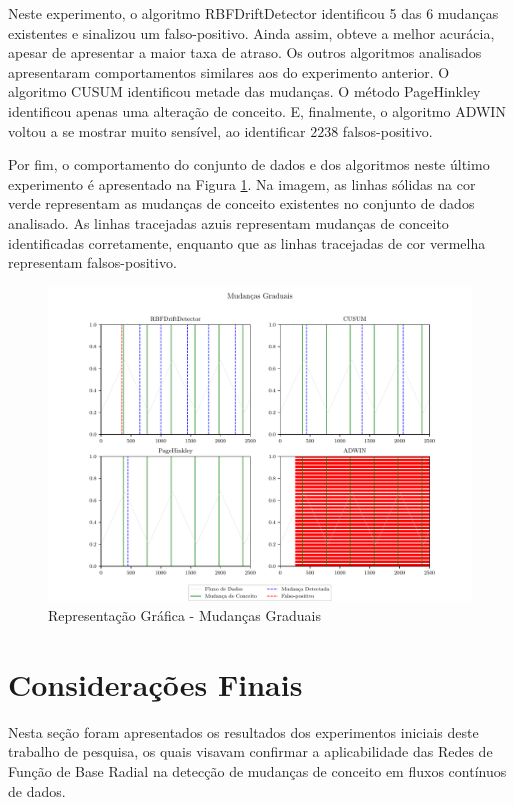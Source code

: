 \documentclass[msc, classic, a4paper]{ufbathesis}
\begin{document}
Neste experimento, o algoritmo RBFDriftDetector identificou 5 das 6 mudanças existentes e sinalizou um falso-positivo.
Ainda assim, obteve a melhor acurácia, apesar de apresentar a maior taxa de atraso.
Os outros algoritmos analisados apresentaram comportamentos similares aos do experimento anterior.
O algoritmo CUSUM identificou metade das mudanças.
O método PageHinkley identificou apenas uma alteração de conceito.
E, finalmente, o algoritmo ADWIN voltou a se mostrar muito sensível, ao identificar $2238$ falsos-positivo.

Por fim, o comportamento do conjunto de dados e dos algoritmos neste último experimento é apresentado na Figura \ref{fig:exp_gradual}.
Na imagem, as linhas sólidas na cor verde representam as mudanças de conceito existentes no conjunto de dados analisado. As linhas tracejadas azuis representam mudanças de conceito identificadas corretamente, enquanto que as linhas tracejadas de cor vermelha representam falsos-positivo.

\begin{figure}[ht]
\begin{center}
    \includegraphics[width=\textwidth]{imagens/gradual.pdf}
    \caption{Representação Gráfica - Mudanças Graduais}
    \label{fig:exp_gradual}
\end{center}
\end{figure}

\section{Considerações Finais}

Nesta seção foram apresentados os resultados dos experimentos iniciais deste trabalho de pesquisa,
os quais visavam confirmar a aplicabilidade das Redes de Função de Base Radial na detecção de mudanças de conceito em fluxos contínuos de dados.
\end{document}
